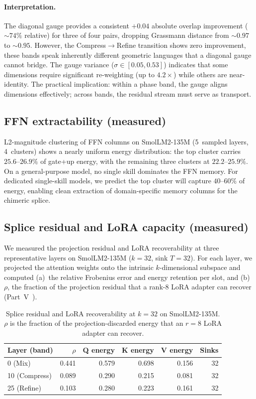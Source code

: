 \documentclass[11pt]{article}
\begin{document}
\paragraph{Interpretation.}  The diagonal gauge provides a consistent
$+0.04$ absolute overlap improvement (${\sim}74\%$ relative) for three
of four pairs, dropping Grassmann distance from ${\sim}0.97$ to
${\sim}0.95$.  However, the Compress$\to$Refine transition shows
zero improvement, these bands speak inherently different
geometric languages that a diagonal gauge cannot bridge.  The gauge
variance ($\sigma{\in}[0.05,0.53]$) indicates that some dimensions
require significant re-weighting (up to $4.2\times$) while others
are near-identity.  The practical implication: within a phase band,
the gauge aligns dimensions effectively; across bands, the residual
stream must serve as transport.

\subsection{FFN extractability (measured)}

L2-magnitude clustering of FFN columns on SmolLM2-135M (5~sampled
layers, 4~clusters) shows a nearly uniform energy distribution:
the top cluster carries $25.6$--$26.9\%$ of gate+up energy, with
the remaining three clusters at $22.2$--$25.9\%$.  On a
general-purpose model, no single skill dominates the FFN memory.
For dedicated single-skill models, we predict the top cluster will
capture $40$--$60\%$ of energy, enabling clean extraction of
domain-specific memory columns for the chimeric splice.

\subsection{Splice residual and LoRA capacity (measured)}

We measured the projection residual and LoRA recoverability at three
representative layers on SmolLM2-135M ($k{=}32$, sink $T{=}32$).
For each layer, we projected the attention weights onto the intrinsic
$k$-dimensional subspace and computed (a)~the relative Frobenius error
and energy retention per slot, and (b)~$\rho$, the fraction of the
projection residual that a rank-$8$ LoRA adapter can recover
(Part~V~\cite{stewart2026distill}).

\begin{table}[h]\centering\small
\caption{Splice residual and LoRA recoverability at $k{=}32$ on
SmolLM2-135M.  $\rho$ is the fraction of the projection-discarded
energy that an $r{=}8$ LoRA adapter can recover.}
\label{tab:splice-residual}
\begin{tabular}{@{}lrrrrr@{}}
\toprule
Layer (band) & $\rho$ & Q energy & K energy & V energy & Sinks \\
\midrule
0  (Mix)     & 0.441 & 0.579 & 0.698 & 0.156 & 32 \\
10 (Compress) & 0.089 & 0.290 & 0.215 & 0.081 & 32 \\
25 (Refine)   & 0.103 & 0.280 & 0.223 & 0.161 & 32 \\
\bottomrule
\end{tabular}
\end{table}
\end{document}
